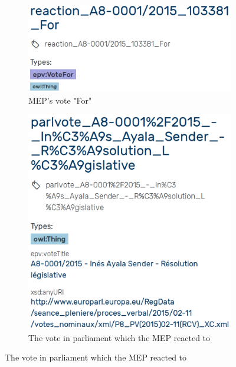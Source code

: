 \documentclass{article}
\begin{document}
\begin{figure}
\begin{subfigure}{.5\textwidth}
  \centering
  \includegraphics[width=.8\linewidth]{images/reaction.png}
  \caption{MEP's vote "For"}
  \label{fig:propertiesReaction}
\end{subfigure}%
\begin{subfigure}{.5\textwidth}
  \centering
  \includegraphics[width=.8\linewidth]{images/vote.png}
  \caption{The vote in parliament which the MEP reacted to}
  \label{fig:propertiesVote}
\end{subfigure}
\label{fig:fig}
\end{figure}
\end{document}
